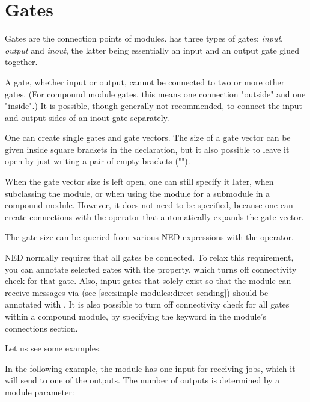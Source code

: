


\section{Gates}
\label{sec:ch-ned-lang:gates}

Gates are the connection points of modules.  {\opp} has three types of
gates: \textit{input}, \textit{output} and \textit{inout}, the latter being
essentially an input and an output gate glued together.

A gate, whether input or output, cannot be connected to two or more other
gates. (For compound module gates, this means one connection "outside" and
one "inside".)  It is possible, though generally not recommended, to
connect the input and output sides of an inout gate separately.

One can create single gates and gate vectors. The size of a gate vector
can be given inside square brackets in the declaration, but it also possible
to leave it open by just writing a pair of empty brackets ("\ttt{[]}").

When the gate vector size is left open, one can still specify it later,
when subclassing the module, or when using the module for a submodule in a
compound module. However, it does not need to be specified, because
one can create connections with the  operator that
automatically expands the gate vector.

The gate size can be queried from various NED expressions with the
 operator.

NED normally requires that all gates be connected. To relax this
requirement, you can annotate selected gates with the 
property, which turns off connectivity check for that gate. Also, input
gates that solely exist so that the module can receive messages via
 (see \ref{sec:simple-modules:direct-sending}) should
be annotated with . It is also possible to turn off connectivity
check for all gates within a compound module, by specifying the
 keyword in the module's connections section.

Let us see some examples.

In the following example, the  module has one input for
receiving jobs, which it will send to one of the outputs. The number of
outputs is determined by a module parameter:

